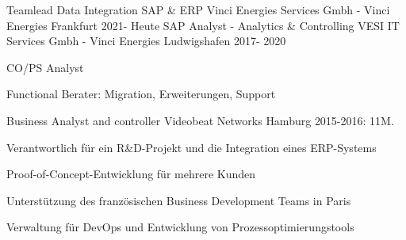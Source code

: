 

\begin{cventries}
        \cventry
                {Teamlead Data Integration SAP \& ERP} %
                {Vinci Energies Services Gmbh - Vinci Energies} %
                {Frankfurt} %
                {2021- Heute} %
                {
                }
	\cventry
		{SAP Analyst - Analytics \& Controlling} %
		{VESI IT Services Gmbh - Vinci Energies} %
		{Ludwigshafen} %
		{2017- 2020} %
		{
		\begin{cvitems} %
			\item {CO/PS Analyst}
			\item {Functional Berater: Migration, Erweiterungen, Support}
		\end{cvitems}
		}

	\cventry
		{Business Analyst and controller} %
		{Videobeat Networks} %
		{Hamburg} %
		{2015-2016: 11M.} %
		{
		\begin{cvitems} %
			\item {Verantwortlich für ein R\&D-Projekt und die Integration eines ERP-Systems}
			\item {Proof-of-Concept-Entwicklung für mehrere Kunden}
			\item {Unterstützung des französischen Business Development Teams in Paris}
			\item {Verwaltung für DevOps und Entwicklung von Prozessoptimierungstools}
		\end{cvitems}
		}


\end{cventries}

